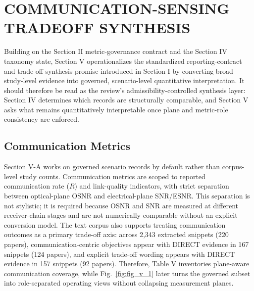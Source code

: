 \FloatBarrier

\section{COMMUNICATION-SENSING TRADEOFF SYNTHESIS}

Building on the Section II metric-governance contract and the Section IV taxonomy state, Section V operationalizes the standardized reporting-contract and trade-off-synthesis promise introduced in Section I by converting broad study-level evidence into governed, scenario-level quantitative interpretation. It should therefore be read as the review's admissibility-controlled synthesis layer: Section IV determines which records are structurally comparable, and Section V asks what remains quantitatively interpretable once plane and metric-role consistency are enforced.

\subsection{Communication Metrics}
Section V-A works on governed scenario records by default rather than corpus-level study counts. Communication metrics are scoped to reported communication rate ($R$) and link-quality indicators, with strict separation between optical-plane OSNR and electrical-plane SNR/ESNR. This separation is not stylistic; it is required because OSNR and SNR are measured at different receiver-chain stages and are not numerically comparable without an explicit conversion model. The text corpus also supports treating communication outcomes as a primary trade-off axis: across 2,343 extracted snippets (220 papers), communication-centric objectives appear with DIRECT evidence in 167 snippets (124 papers), and explicit trade-off wording appears with DIRECT evidence in 157 snippets (92 papers). Therefore, Table V inventories plane-aware communication coverage, while Fig.~\ref{fig:fig_v_1} later turns the governed subset into role-separated operating views without collapsing measurement planes.

